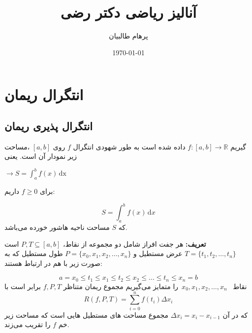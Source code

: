 \documentclass[12pt]{report}
\begin{document}
	

	\title{آنالیز ریاضی دکتر رضی}
	\author{پرهام طالبیان}
	\date{\today}
	\maketitle
	
	\tableofcontents
	
	
	\chapter{انتگرال ریمان}
	\label{ch1}
	
	\section{انتگرال پذیری ریمان }
	
	
	
	گیریم 
	$f:[a,b]\rightarrow\mathbb{R}$
	داده شده است به طور شهودی انتگرال 
	$f$
	روی 
	$[a,b]$
	،مساحت زیر نمودار آن است. یعنی
	
	
$\rightarrow S = \int_{a}^{b} f(x)\, \mathrm{dx}$



برای 
$f \geq 0$
داریم:

\[
	S = \int_{a}^{b} f(x)\, \mathrm{d}x
\]
که 
$S$
مساحت ناحیه هاشور خورده می‌باشد.


\textbf{تعریف:}
هر جفت افراز شامل دو مجموعه از نقاط،
$P,T \subseteq [a,b]$
است
$T = \{t_1, t_2, \dots, t_n\}$
عرض مستطیل و 
$P = \{x_0, x_1, x_2, \dots, x_n\}$
طول مستطیل که به صورت زیر با هم در ارتباط هستند:

\[
a = x_0 \leq t_1 \leq x_1 \leq t_2 \leq x_2 \leq \dots \leq t_n \leq x_n = b
\]
نقاط 
\, $x_0, x_1, x_2, \dots, x_n$\,
را متمایز می‌گیریم مجموع ریمان متناظر 
$f, P, T$
برابر است با
\[
R(f, P, T) = \sum_{i = 0}^n f(t_i) \Delta x_i
\]
که در آن 
$\Delta x_i = x_i - x_{i - 1}$
مجموع مساحت های مستطیل‌ هایی است که مساحت زیر خم $f$ را تقریب می‌زند.
\end{document}
